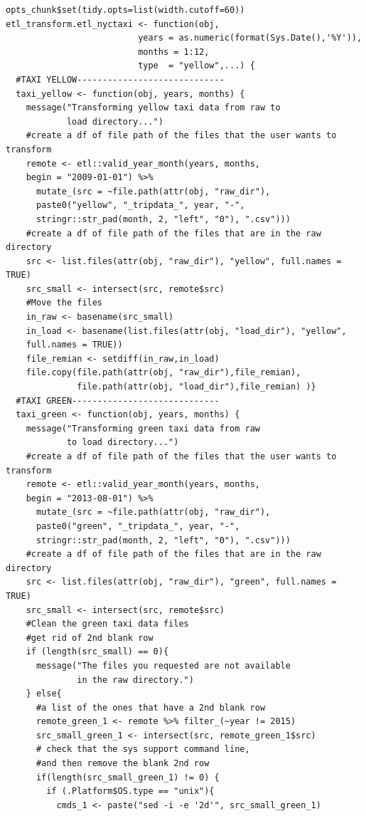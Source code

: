 \documentclass[12pt,twoside]{reedthesis}
\theoremstyle{definition}
\theoremstyle{definition}
\theoremstyle{definition}
\theoremstyle{remark}
\begin{document}
\begin{verbatim}
opts_chunk$set(tidy.opts=list(width.cutoff=60))
etl_transform.etl_nyctaxi <- function(obj, 
                          years = as.numeric(format(Sys.Date(),'%Y')), 
                          months = 1:12, 
                          type  = "yellow",...) {
  #TAXI YELLOW-----------------------------
  taxi_yellow <- function(obj, years, months) {
    message("Transforming yellow taxi data from raw to 
            load directory...")
    #create a df of file path of the files that the user wants to transform
    remote <- etl::valid_year_month(years, months, 
    begin = "2009-01-01") %>%
      mutate_(src = ~file.path(attr(obj, "raw_dir"), 
      paste0("yellow", "_tripdata_", year, "-",
      stringr::str_pad(month, 2, "left", "0"), ".csv"))) 
    #create a df of file path of the files that are in the raw directory
    src <- list.files(attr(obj, "raw_dir"), "yellow", full.names = TRUE)
    src_small <- intersect(src, remote$src)
    #Move the files
    in_raw <- basename(src_small)
    in_load <- basename(list.files(attr(obj, "load_dir"), "yellow", 
    full.names = TRUE))
    file_remian <- setdiff(in_raw,in_load)
    file.copy(file.path(attr(obj, "raw_dir"),file_remian),
              file.path(attr(obj, "load_dir"),file_remian) )}
  #TAXI GREEN-----------------------------
  taxi_green <- function(obj, years, months) {
    message("Transforming green taxi data from raw 
            to load directory...")
    #create a df of file path of the files that the user wants to transform
    remote <- etl::valid_year_month(years, months, 
    begin = "2013-08-01") %>%
      mutate_(src = ~file.path(attr(obj, "raw_dir"), 
      paste0("green", "_tripdata_", year, "-",
      stringr::str_pad(month, 2, "left", "0"), ".csv"))) 
    #create a df of file path of the files that are in the raw directory
    src <- list.files(attr(obj, "raw_dir"), "green", full.names = TRUE)
    src_small <- intersect(src, remote$src)
    #Clean the green taxi data files
    #get rid of 2nd blank row
    if (length(src_small) == 0){
      message("The files you requested are not available 
              in the raw directory.")
    } else{
      #a list of the ones that have a 2nd blank row
      remote_green_1 <- remote %>% filter_(~year != 2015)
      src_small_green_1 <- intersect(src, remote_green_1$src)
      # check that the sys support command line, 
      #and then remove the blank 2nd row
      if(length(src_small_green_1) != 0) {
        if (.Platform$OS.type == "unix"){
          cmds_1 <- paste("sed -i -e '2d'", src_small_green_1)

\end{verbatim}
\end{document}
